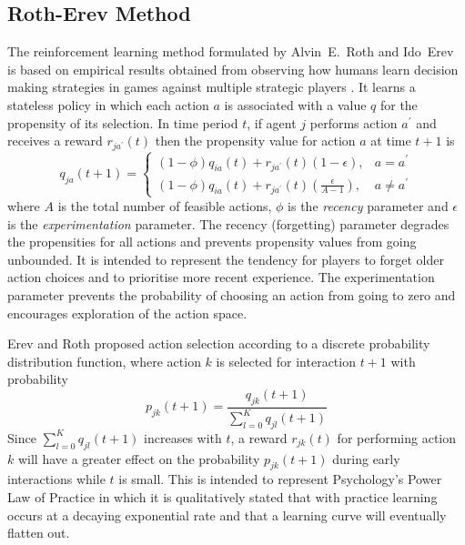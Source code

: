 \subsection{Roth-Erev Method}
\label{sec:rotherev}
The reinforcement learning method formulated by Alvin~E.~Roth and Ido~Erev is
based on empirical results obtained from observing how humans learn decision
making strategies in games against multiple strategic players
\cite{roth:games,roth:aer}.  It learns a stateless policy in which each action
$a$ is associated with a value $q$ for the propensity of its selection.  In
time period $t$, if agent $j$ performs action $a^\prime$ and receives a reward
$r_{ja^\prime}(t)$ then the propensity value for action $a$ at time $t+1$ is
\begin{equation}
\label{eq:rotherev}
q_{ja}(t+1) =
\begin{cases}
(1-\phi)q_{ia}(t) + r_{ja^\prime}(t)(1-\epsilon), & \text{$a = a^\prime$} \\
(1-\phi)q_{ia}(t) + r_{ja^\prime}(t)(\frac{\epsilon}{A-1}), & \text{$a \ne
a^\prime$}
\end{cases}
\end{equation}
where $A$ is the total number of feasible actions, $\phi$ is the
\textit{recency} parameter and $\epsilon$ is the \textit{experimentation} parameter.  The recency (forgetting) parameter
degrades the propensities for all actions and prevents propensity values from
going unbounded.  It is intended to represent the tendency for players to forget
older action choices and to prioritise more recent experience.  The
experimentation parameter prevents the probability of choosing an action from
going to zero and encourages exploration of the action space.

Erev and Roth proposed action selection according to a discrete probability
distribution function, where action $k$ is selected for interaction $t+1$ with
probability
\begin{equation}
\label{eq:re_prob}
p_{jk}(t+1) = \frac{q_{jk}(t+1)}{\sum_{l=0}^K q_{jl}(t+1)}
\end{equation}
Since $\sum_{l=0}^K q_{jl}(t+1)$ increases with $t$, a reward $r_{jk}(t)$ for
performing action $k$ will have a greater effect on the probability
$p_{jk}(t+1)$ during early interactions while $t$ is small.  This is intended
to represent Psychology's Power Law of Practice in which it is qualitatively
stated that with practice learning occurs at a decaying exponential rate and
that a learning curve will eventually flatten out.


